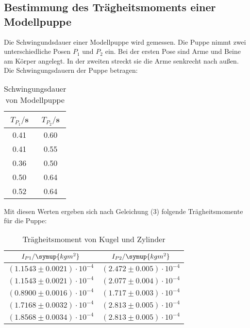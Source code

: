 \subsection{Bestimmung des Trägheitsmoments einer Modellpuppe}
Die Schwingundsdauer einer Modellpuppe wird gemessen. Die Puppe nimmt zwei unterschiedliche
Posen $P_1$ und $P_2$ ein. Bei der ersten Pose sind Arme und Beine am Körper angelegt. In der zweiten
streckt sie die Arme senkrecht nach außen. Die Schwingungsdauern der Puppe betragen:
\begin{table}
  \centering
  \caption{Schwingungsdauer von Modellpuppe}
  \label{tab:Schwingungsdauer von Modellpuppe}
  \begin{tabular}{c c}
    \toprule
    $T_{P_1}/$s & $T_{P_2}/$s \\
    \midrule
    0.41 & 0.60 \\
    0.41 & 0.55 \\
    0.36 & 0.50 \\
    0.50 & 0.64 \\
    0.52 & 0.64 \\
    \bottomrule
  \end{tabular}
\end{table}

Mit diesen Werten ergeben sich nach Geleichung (3) folgende Trägheitsmomente
für die Puppe:
\begin{table}[H]
  \centering
  \caption{Trägheitsmoment von Kugel und Zylinder}
  \label{tab:Trägheitsmoment von Kugel und Zylinder}
  \begin{tabular}{c c}
    \toprule
    $I_{P1}/\symup{kgm^2}$ & $I_{P2}/\symup{kgm^2}$ \\
    \midrule
    $(1.1543 \pm 0.0021)\cdot 10^{-4}$ & $(2.472 \pm 0.005)\cdot 10^{-4}$ \\
    $(1.1543 \pm 0.0021)\cdot 10^{-4}$ & $(2.077 \pm 0.004)\cdot 10^{-4}$ \\
    $(0.8900 \pm 0.0016)\cdot 10^{-4}$ & $(1.717 \pm 0.003)\cdot 10^{-4}$ \\
    $(1.7168 \pm 0.0032)\cdot 10^{-4}$ & $(2.813 \pm 0.005)\cdot 10^{-4}$ \\
    $(1.8568 \pm 0.0034)\cdot 10^{-4}$ & $(2.813 \pm 0.005)\cdot 10^{-4}$ \\
    \bottomrule
  \end{tabular}
\end{table}

